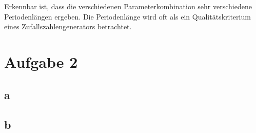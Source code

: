 Erkennbar ist, dass die verschiedenen Parameterkombination sehr verschiedene Periodenlängen ergeben. Die Periodenlänge wird oft als ein Qualitätskriterium eines Zufallszahlengenerators betrachtet.




\section*{Aufgabe 2}

\subsection*{a}


\subsection*{b}



